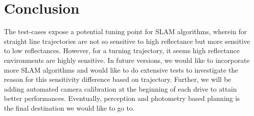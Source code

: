 \documentclass[a4paper, 10pt, conference]{ieeeconf}      %
\begin{document}
\section{Conclusion}
The test-cases expose a potential tuning point for SLAM algorithms, wherein for straight line trajectories are not so sensitive to high reflectance but more sensitive to low reflectances. However, for a turning trajectory, it seems high reflectance environments are highly sensitive. In future versions, we would like to incorporate more SLAM algorithms and would like to do extensive tests to investigate the reason for this sensitivity difference based on trajectory. Further, we will be adding automated camera calibration at the beginning of each drive to attain better performances. Eventually, perception and photometry based planning is the final destination we would like to go to.



\end{document}
